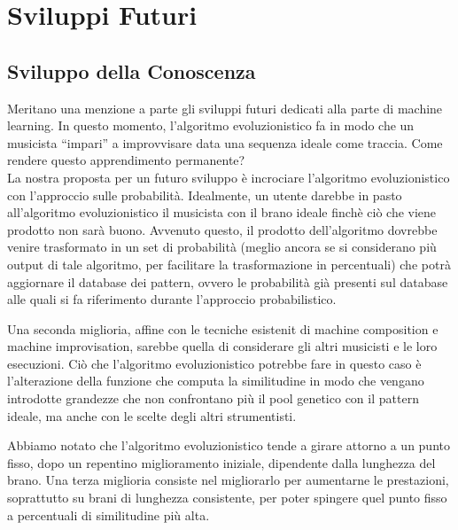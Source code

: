 \section{Sviluppi Futuri}
\subsection{Sviluppo della Conoscenza}
Meritano una menzione a parte gli sviluppi futuri dedicati alla parte di machine learning.
In questo momento, l'algoritmo evoluzionistico fa in modo che un musicista ``impari'' a improvvisare data una sequenza ideale come traccia.
Come rendere questo apprendimento permanente?\\
La nostra proposta per un futuro sviluppo è incrociare l'algoritmo evoluzionistico con l'approccio sulle probabilità.
Idealmente, un utente darebbe in pasto all'algoritmo evoluzionistico il musicista con il brano ideale finchè ciò che viene prodotto non sarà buono.
Avvenuto questo, il prodotto dell'algoritmo dovrebbe venire trasformato in un set di probabilità (meglio ancora se si considerano più output di tale algoritmo, per facilitare la trasformazione in percentuali) che potrà aggiornare il database dei pattern, ovvero le probabilità già presenti sul database alle quali si fa riferimento durante l'approccio probabilistico.
\newline

Una seconda miglioria, affine con le tecniche esistenit di machine composition e machine improvisation, sarebbe quella di considerare gli altri musicisti e le loro esecuzioni.
Ciò che l'algoritmo evoluzionistico potrebbe fare in questo caso è l'alterazione della funzione che computa la similitudine in modo che vengano introdotte grandezze che non confrontano più il pool genetico con il pattern ideale, ma anche con le scelte degli altri strumentisti.
\newline

Abbiamo notato che l'algoritmo evoluzionistico tende a girare attorno a un punto fisso, dopo un repentino miglioramento iniziale, dipendente dalla lunghezza del brano.
Una terza miglioria consiste nel migliorarlo per aumentarne le prestazioni, soprattutto su brani di lunghezza consistente, per poter spingere quel punto fisso a percentuali di similitudine più alta.